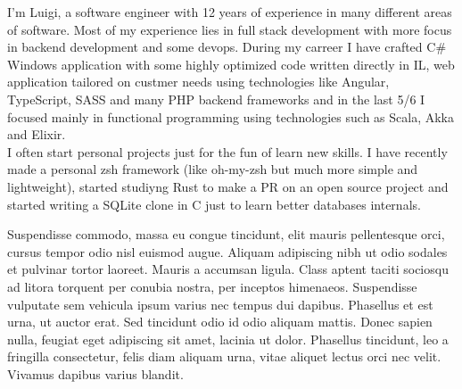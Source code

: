\documentclass{resume} %
\begin{document}

\makelettertitle


\begin{cvletter}

I'm Luigi, a software engineer with 12 years of experience in many different areas of software. Most of my experience lies in full stack development with more focus in backend development and some devops.
During my carreer I have crafted C# Windows application with some highly optimized code written directly in IL, web application tailored on custmer needs using technologies like Angular, TypeScript, SASS and many
PHP backend frameworks and in the last 5/6 I focused mainly in functional programming using technologies such as Scala, Akka and Elixir. \\ I often start personal projects just for the fun of learn new skills.
I have recently made a personal zsh framework (like oh-my-zsh but much more simple and lightweight), started studiyng Rust to make a PR on an open source project and started writing a SQLite clone in C just to learn better databases internals.

Suspendisse commodo, massa eu congue tincidunt, elit mauris pellentesque orci, cursus tempor odio nisl euismod augue. Aliquam adipiscing nibh ut odio sodales et pulvinar tortor laoreet. Mauris a accumsan ligula. Class aptent taciti sociosqu ad litora torquent per conubia nostra, per inceptos himenaeos. Suspendisse vulputate sem vehicula ipsum varius nec tempus dui dapibus. Phasellus et est urna, ut auctor erat. Sed tincidunt odio id odio aliquam mattis. Donec sapien nulla, feugiat eget adipiscing sit amet, lacinia ut dolor. Phasellus tincidunt, leo a fringilla consectetur, felis diam aliquam urna, vitae aliquet lectus orci nec velit. Vivamus dapibus varius blandit.

\end{cvletter}


\makeletterclosing
\end{document}
